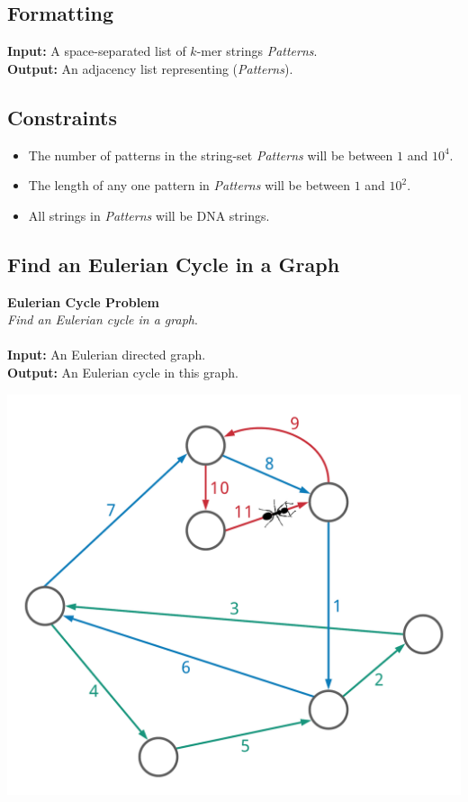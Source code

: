 \documentclass{article}
\renewcommand{\sc}[1]{\text{\scshape #1}}
\begin{document}
\subsection*{Formatting}
\noindent\textbf{Input:} A space-separated list of $k$-mer strings \emph{Patterns}.\\
\noindent\textbf{Output:} An adjacency list representing \sc{DeBruijn}(\emph{Patterns}).

\subsection*{Constraints}
\begin{itemize}
    \item The number of patterns in the string-set \emph{Patterns} will be between $1$ and $10^4$.
    \item The length of any one pattern in \emph{Patterns} will be between $1$ and $10^2$.
    \item All strings in \emph{Patterns} will be DNA strings.
\end{itemize}
\pagebreak

\subsection{Find an Eulerian Cycle in a Graph}
\hline\vspace{5}
\textbf{Eulerian Cycle Problem}\\
\emph{Find an Eulerian cycle in a graph}.\\ \\
\textbf{Input:} An Eulerian directed graph.\\
\textbf{Output:} An Eulerian cycle in this graph.
\begin{center}
    \includegraphics[scale=0.12]{c3/logos/3F.png}
\end{center}
\hline\vspace{5}
\end{document}
